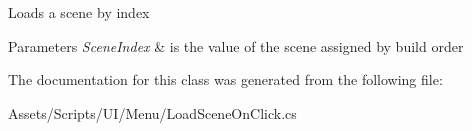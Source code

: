 Loads a scene by index 
\begin{DoxyParams}{Parameters}
{\em Scene\+Index} & is the value of the scene assigned by build order \\
\hline
\end{DoxyParams}


The documentation for this class was generated from the following file\+:\begin{DoxyCompactItemize}
\item 
Assets/\+Scripts/\+U\+I/\+Menu/Load\+Scene\+On\+Click.\+cs\end{DoxyCompactItemize}

